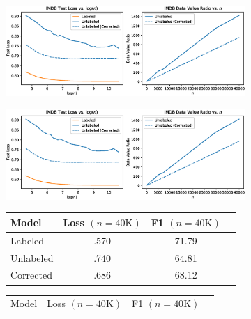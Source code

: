 \begin{figure}
    \centering
    \ifsinglecolumn
    \begin{subfigure}{.75\textwidth}
      \centering
      \includegraphics[width=\linewidth]{eps_figures/real_biases_data_value_ratio.eps}
    \end{subfigure}
    \else
    \begin{subfigure}{.48\textwidth}
      \centering
      \includegraphics[width=\linewidth]{eps_figures/real_biases_data_value_ratio.eps}
    \end{subfigure}
    \fi
   \ifsinglecolumn
    \begin{subfigure}{.6\textwidth}
      \small
      \centering
      {\renewcommand{\arraystretch}{1.2}
      \begin{tabular}{lccr}
      \hline
      Model & Loss $(n=40\text{K})$ & F1 $(n=40\text{K})$ \\
      \hline
      Labeled & .570 & 71.79 \\
      Unlabeled & .740 & 64.81 \\
      Corrected & .686 & 68.12 \\
      \hline
      \end{tabular}
      }
    \end{subfigure}   
   \else
    \begin{subfigure}{.48\textwidth}
      \small
      \centering
      {\renewcommand{\arraystretch}{1.2}
      \begin{tabular}{lccr}
      \hline
      Model & Loss $(n=40\text{K})$ & F1 $(n=40\text{K})$ \\

\end{tabular}}
\end{subfigure}
\end{figure}
